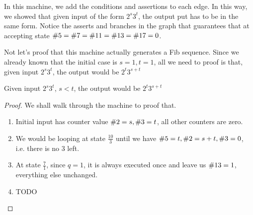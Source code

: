 In this machine, we add the conditions and assertions to each edge.
In this way, we showed that given input of the form $2^s3^t$, the output put has to be in the same form.
Notice the asserts and branches in the graph that guarantees that at accepting state $\V = \VII = \XI = \XIII = \XVII = 0$.

Not let's proof that this machine actually generates a Fib sequence.
Since we already known that the initial case is $s = 1, t = 1$, all we need to proof is that, given input $2^s3^t$, the output would be $2^t3^{s+t}$

\begin{theorem}
    Given input $2^s3^t$, $s < t$, the output would be $2^t3^{s+t}$
\end{theorem}

\begin{proof}

    We shall walk through the machine to proof that.
    \begin{enumerate}
        \item Initial input has counter value $\II = s, \III = t$, all other counters are zero.
        \item We would be looping at state $\frac{10}{3}$ until we have $\V = t, \II = s + t, \III = 0$, i.e. there is no $3$ left. 
        \item At state $\frac{7}{1}$, since $q = 1$, it is always executed once and leave us $\XIII = 1$, everything else unchanged.
        \item TODO
    \end{enumerate}
\end{proof}

